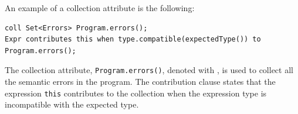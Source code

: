 \begin{itemize}
    An example of a collection attribute is the following:
    \begin{lstlisting}[language=JastAdd]
coll Set<Errors> Program.errors();
Expr contributes this when type.compatible(expectedType()) to Program.errors();
    \end{lstlisting}
    The collection attribute, \texttt{Program.errors()}, denoted with ,
    is used to collect all the semantic errors in the program. The contribution clause
    states that the expression \texttt{this} contributes to the collection when
    the expression type is incompatible with the expected type.
\end{itemize}




